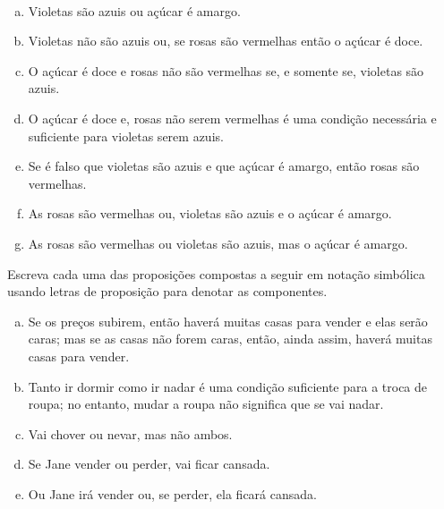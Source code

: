 \documentclass[a4paper, 12pt, addpoints]{exam}
\begin{document}
\begin{questions}
  \begin{resp}~
    
      \begin{enumerate}[a)]
        \item Violetas são azuis ou açúcar é amargo.
        \item Violetas não são azuis ou, se rosas são vermelhas então o açúcar é doce.
        \item O açúcar é doce e rosas não são vermelhas se, e somente se, violetas são
        azuis.
        \item O açúcar é doce e, rosas não serem vermelhas é uma condição necessária e
        suficiente para violetas serem azuis.
        \item Se é falso que violetas são azuis e que açúcar é amargo, então rosas são
        vermelhas.
        \item As rosas são vermelhas ou, violetas são azuis e o açúcar é amargo.
        \item As rosas são vermelhas ou violetas são azuis, mas o açúcar é amargo.
      \end{enumerate}
    
  \end{resp}

  \question Escreva cada uma das proposições compostas a seguir em notação simbólica usando
  letras de proposição para denotar as componentes.

  \begin{enumerate}[a)]
    \item Se os preços subirem, então haverá muitas casas para vender e elas serão
          caras; mas se as casas não forem caras, então, ainda assim, haverá muitas casas para
          vender.
    \item Tanto ir dormir como ir nadar é uma condição suficiente para a troca de roupa;
          no entanto, mudar a roupa não significa que se vai nadar.
    \item Vai chover ou nevar, mas não ambos.
    \item Se Jane vender ou perder, vai ficar cansada.
    \item Ou Jane irá vender ou, se perder, ela ficará cansada.
  \end{enumerate}


\end{questions}
\end{document}
